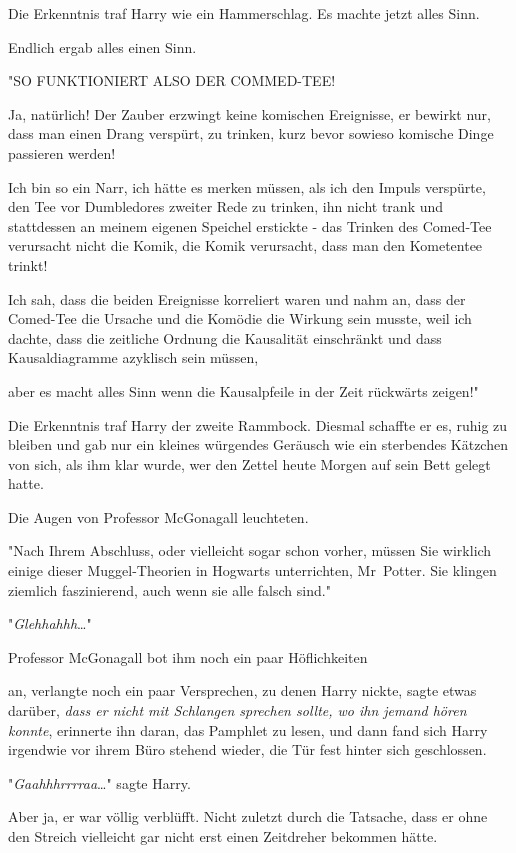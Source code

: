 {Die Erkenntnis traf Harry wie ein Hammerschlag. Es machte jetzt alles Sinn.

Endlich ergab alles einen Sinn.

"SO FUNKTIONIERT ALSO DER COMMED-TEE!

Ja, natürlich! Der Zauber erzwingt keine komischen Ereignisse, er bewirkt nur, dass man einen Drang verspürt, zu trinken, kurz bevor sowieso komische Dinge passieren werden!

Ich bin so ein Narr, ich hätte es merken müssen, als ich den Impuls verspürte, den Tee vor Dumbledores zweiter Rede zu trinken, ihn nicht trank und stattdessen an meinem eigenen Speichel erstickte - das Trinken des Comed-Tee verursacht nicht die Komik, die Komik verursacht, dass man den Kometentee trinkt!

Ich sah, dass die beiden Ereignisse korreliert waren und nahm an, dass der Comed-Tee die Ursache und die Komödie die Wirkung sein musste, weil ich dachte, dass die zeitliche Ordnung die Kausalität einschränkt und dass Kausaldiagramme azyklisch sein müssen,

aber es macht alles Sinn wenn die Kausalpfeile in der Zeit rückwärts zeigen!"

Die Erkenntnis traf Harry der zweite Rammbock. Diesmal schaffte er es, ruhig zu bleiben und gab nur ein kleines würgendes Geräusch wie ein sterbendes Kätzchen von sich, als ihm klar wurde, wer den Zettel heute Morgen auf sein Bett gelegt hatte.

Die Augen von Professor McGonagall leuchteten.

"Nach Ihrem Abschluss, oder vielleicht sogar schon vorher, müssen Sie wirklich einige dieser Muggel-Theorien in Hogwarts unterrichten, Mr~Potter. Sie klingen ziemlich faszinierend, auch wenn sie alle falsch sind."

"\emph{Glehhahhh}…"

Professor McGonagall bot ihm noch ein paar Höflichkeiten

an, verlangte noch ein paar Versprechen, zu denen Harry nickte, sagte etwas darüber, \emph{dass er nicht mit Schlangen sprechen sollte, wo ihn jemand hören konnte}, erinnerte ihn daran, das Pamphlet zu lesen, und dann fand sich Harry irgendwie vor ihrem Büro stehend wieder, die Tür fest hinter sich geschlossen.

"\emph{Gaahhhrrrraa}…" sagte Harry.

Aber ja, er war völlig verblüfft. Nicht zuletzt durch die Tatsache, dass er ohne den Streich vielleicht gar nicht erst einen Zeitdreher bekommen hätte.

}

